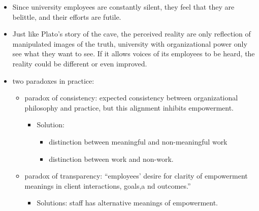 \documentclass[
]{book}
\providecommand{\tightlist}{%
  \setlength{\itemsep}{0pt}\setlength{\parskip}{0pt}}
\begin{document}
\citep{Gan_2020}

\begin{itemize}
\tightlist
\item
  Since university employees are constantly silent, they feel that they are belittle, and their efforts are futile.
\item
  Just like Plato's story of the cave, the perceived reality are only reflection of manipulated images of the truth, university with organizational power only see what they want to see. If it allows voices of its employees to be heard, the reality could be different or even improved.
\end{itemize}

\citep{D_Enbeau_2013}

\begin{itemize}
\item
  two paradoxes in practice:

  \begin{itemize}
  \item
    paradox of consistency: expected consistency between organizational philosophy and practice, but this alignment inhibits empowerment.

    \begin{itemize}
    \item
      Solution:

      \begin{itemize}
      \item
        distinction between meaningful and non-meaningful work
      \item
        distinction between work and non-work.
      \end{itemize}
    \end{itemize}
  \item
    paradox of transparency: ``employees' desire for clarity of empowerment meanings in client interactions, goals,a nd outcomes.''

    \begin{itemize}
    \tightlist
    \item
      Solutions: staff has alternative meanings of empowerment.
    \end{itemize}
  \end{itemize}
\end{itemize}

\citep{Kantola_2014}
\end{document}
